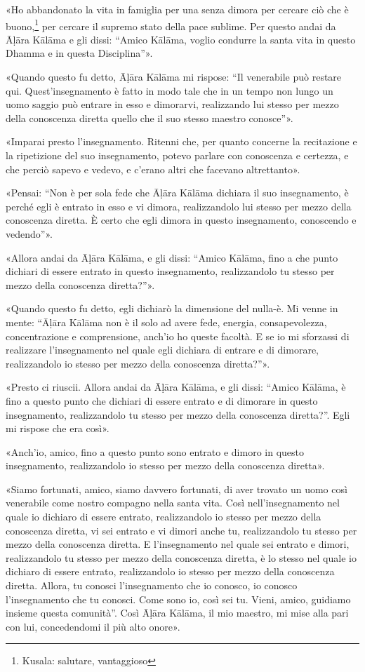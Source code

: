 

 «Ho abbandonato la vita in famiglia per una senza dimora per
cercare ciò che è buono,\footnote{Kusala: salutare, vantaggioso} per cercare
il supremo stato della pace sublime. Per questo andai da Āḷāra Kālāma e gli dissi: “Amico
Kālāma, voglio condurre la santa vita in questo Dhamma e in questa
Disciplina”».


«Quando questo fu detto, Āḷāra Kālāma mi rispose: “Il venerabile può
restare qui. Quest’insegnamento è fatto in modo tale che in un tempo non
lungo un uomo saggio può entrare in esso e dimorarvi, realizzando lui
stesso per mezzo della conoscenza diretta quello che il suo stesso
maestro conosce”».


«Imparai presto l’insegnamento. Ritenni che, per quanto concerne la
recitazione e la ripetizione del suo insegnamento, potevo parlare con
conoscenza e certezza, e che perciò sapevo e vedevo, e c’erano altri che
facevano altrettanto».


«Pensai: “Non è per sola fede che Āḷāra Kālāma dichiara il suo
insegnamento, è perché egli è entrato in esso e vi dimora, realizzandolo
lui stesso per mezzo della conoscenza diretta. È certo che egli dimora
in questo insegnamento, conoscendo e vedendo”».


«Allora andai da Āḷāra Kālāma, e gli dissi: “Amico Kālāma, fino a che
punto dichiari di essere entrato in questo insegnamento, realizzandolo
tu stesso per mezzo della conoscenza diretta?”».


«Quando questo fu detto, egli dichiarò la dimensione del nulla-è. Mi
venne in mente: “Āḷāra Kālāma non è il solo ad avere fede, energia,
consapevolezza, concentrazione e comprensione, anch’io ho queste
facoltà. E se io mi sforzassi di realizzare l’insegnamento nel quale
egli dichiara di entrare e di dimorare, realizzandolo io stesso per
mezzo della conoscenza diretta?”».


«Presto ci riuscii. Allora andai da Āḷāra Kālāma, e gli dissi: “Amico
Kālāma, è fino a questo punto che dichiari di essere entrato e di
dimorare in questo insegnamento, realizzandolo tu stesso per mezzo della
conoscenza diretta?”. Egli mi rispose che era così».


«Anch’io, amico, fino a questo punto sono entrato e dimoro in questo
insegnamento, realizzandolo io stesso per mezzo della conoscenza
diretta».


«Siamo fortunati, amico, siamo davvero fortunati, di aver trovato un
uomo così venerabile come nostro compagno nella santa vita. Così
nell’insegnamento nel quale io dichiaro di essere entrato, realizzandolo
io stesso per mezzo della conoscenza diretta, vi sei entrato e vi dimori
anche tu, realizzandolo tu stesso per mezzo della conoscenza diretta. E
l’insegnamento nel quale sei entrato e dimori, realizzandolo tu stesso
per mezzo della conoscenza diretta, è lo stesso nel quale io dichiaro di
essere entrato, realizzandolo io stesso per mezzo della conoscenza
diretta. Allora, tu conosci l’insegnamento che io conosco, io conosco
l’insegnamento che tu conosci. Come sono io, così sei tu. Vieni, amico,
guidiamo insieme questa comunità”. Così Āḷāra Kālāma, il mio maestro, mi
mise alla pari con lui, concedendomi il più alto onore».


